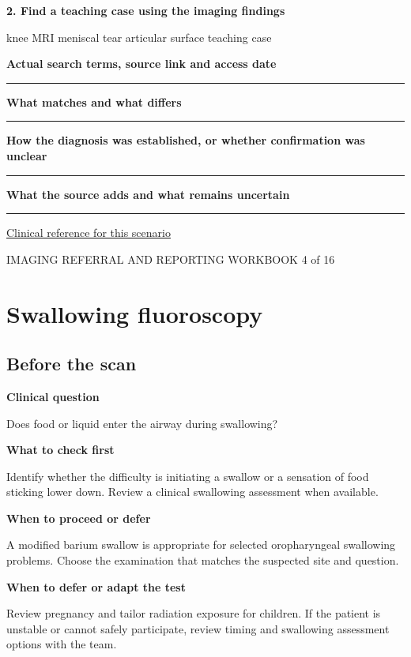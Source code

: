 \documentclass[11pt,a4paper]{article}
\newcommand{\record}[1]{\textbf{#1}\par\vspace{0.55\baselineskip}\hrule\vspace{0.35\baselineskip}}
\begin{document}
\textbf{2. Find a teaching case using the imaging findings}\par knee MRI meniscal tear articular surface teaching case\par

\record{Actual search terms, source link and access date}

\record{What matches and what differs}

\record{How the diagnosis was established, or whether confirmation was unclear}

\record{What the source adds and what remains uncertain}

\small\href{https://acsearch.acr.org/docs/69432/Narrative}{Clinical reference for this scenario}

\normalsize

\newpage

{\small IMAGING REFERRAL AND REPORTING WORKBOOK \hfill 4 of 16}

\section*{Swallowing fluoroscopy}

\subsection*{Before the scan}

\textbf{Clinical question}\par Does food or liquid enter the airway during swallowing?\par

\textbf{What to check first}\par Identify whether the difficulty is initiating a swallow or a sensation of food sticking lower down. Review a clinical swallowing assessment when available.\par

\textbf{When to proceed or defer}\par A modified barium swallow is appropriate for selected oropharyngeal swallowing problems. Choose the examination that matches the suspected site and question.\par

\textbf{When to defer or adapt the test}\par Review pregnancy and tailor radiation exposure for children. If the patient is unstable or cannot safely participate, review timing and swallowing assessment options with the team.\par
\end{document}
